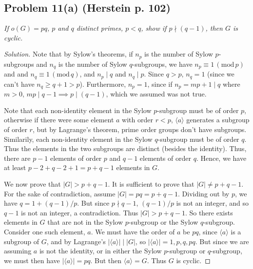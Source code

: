 \documentclass{article}
\begin{document}
\subsection*{Problem 11(a) (Herstein p. 102)}
{\it If $o(G) = pq$, $p$ and $q$ distinct primes, $p < q$, show
if $p \nmid (q-1)$, then $G$ is cyclic.}
\begin{proof}[Solution]\let\qed\relax
	Note that by Sylow's theorems,
	if $n_p$ is the number of Sylow $p$-subgroups
	and $n_q$ is the number of Sylow $q$-subgroups,
	we have $n_p \equiv 1\, (\mathrm{mod}\, p)$ and
	and $n_q \equiv 1\, (\mathrm{mod}\, q)$,
	and $n_p \mid q$ and $n_q \mid p$.
	Since $q > p$, $n_q = 1$ (since we can't have $n_q \geq q+1 > p$).
	Furthermore, $n_p = 1$,
	since if $n_p = mp + 1 \mid q$ where $m > 0$,
	$mp \mid q - 1\implies p \mid (q-1)$,
	which we assumed was not true.

	Note that each non-identity element in the Sylow $p$-subgroup must be of order $p$,
	otherwise if there were some element $a$ with order $r < p$,
	$\langle a \rangle$ generates a subgroup of order $r$,
	but by Lagrange's theorem, prime order groups don't have subgroups.
	Similarily, each non-identity element in the Sylow $q$-subgroup must be of order $q$.
	Thus the elements in the two subgroups are distinct (besides the identity).
	Thus, there are $p-1$ elements of order $p$ and $q-1$ elements of order $q$.
	Hence, we have at least $p-2 + q-2 + 1 = p + q - 1$ elements in $G$.

	We now prove that $|G| > p + q - 1$.
	It is sufficient to prove that $|G| \neq p + q - 1$.
	For the sake of contradiction, assume $|G| = pq = p + q - 1$.
	Dividing out by $p$, we have $q = 1 + (q-1)/p$.
	But since $p \nmid q - 1$, $(q-1)/p$ is not an integer,
	and so $q - 1$ is not an integer, a contradiction.
	Thus $|G| > p + q - 1$.
	So there exists elements in $G$ that are not in the
	Sylow $p$-subgroup or the Sylow $q$-subgroup.
	Consider one such element, $a$.
	We must have the order of $a$ be $pq$,
	since $\langle a \rangle$ is a subgroup of $G$,
	and by Lagrange's $|\langle a \rangle| \mid |G|$,
	so $|\langle a \rangle| = 1,p,q,pq$.
	But since we are assuming $a$ is not the identity,
	or in either the Sylow $p$-subgroup or $q$-subgroup,
	we must then have $|\langle a \rangle| = pq$.
	But then $\langle a \rangle = G$.
	Thus $G$ is cyclic.
\end{proof}
\end{document}
